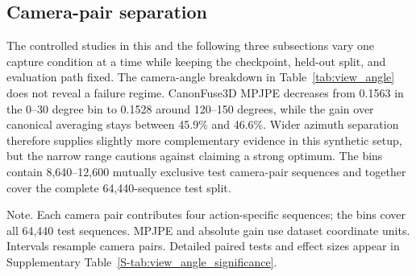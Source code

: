\documentclass[preprint,12pt]{elsarticle}
\renewcommand{\textit}[1]{\textup{#1}}
\providecommand{\DIFaddbegin}{} %
\providecommand{\DIFaddend}{} %
\providecommand{\DIFadd}[1]{{\protect\color{blue}#1}} %
\begin{document}
\FloatBarrier
\subsection{ \DIFaddbegin \DIFadd{Camera-pair separation}\DIFaddend }

The controlled studies \DIFaddbegin \DIFadd{in this and the following three subsections }\DIFaddend vary one capture condition at a time while keeping the checkpoint, held-out split, and evaluation path fixed.  The camera-angle breakdown in Table~\ref{tab:view_angle} does not reveal a failure regime. CanonFuse3D MPJPE decreases from 0.1563 in the 0--30 degree bin to 0.1528 around 120--150 degrees, while the gain over canonical averaging stays between 45.9\% and 46.6\%. Wider azimuth separation therefore supplies slightly more complementary evidence in this synthetic setup, but the narrow range cautions against claiming a strong optimum. The bins contain 8,640--12,600 mutually exclusive test camera-pair sequences and together cover the complete 64,440-sequence test split.

\begin{table}[t]
\centering
\caption{Accuracy and camera-pair bootstrap intervals by azimuth separation. Positive gain favors CanonFuse3D.}
\label{tab:view_angle}
\small
\setlength{\tabcolsep}{4pt}
\vspace{0.3em}
\begin{minipage}{0.97\linewidth}
\footnotesize\textit{Note.} Each camera pair contributes four action-specific sequences; the bins cover all 64,440 test sequences. MPJPE and absolute gain use dataset coordinate units. Intervals resample camera pairs. Detailed paired tests and effect sizes appear in Supplementary Table~\ref{S-tab:view_angle_significance}.
\end{minipage}
\end{table}
\end{document}
